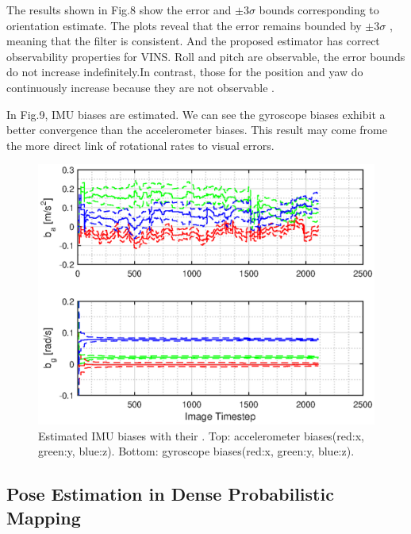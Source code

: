 \documentclass[a4paper, 10pt, conference]{ieeeconf}      %
\begin{document}
The results shown in Fig.8 show the error and $ \pm 3 \sigma $ bounds corresponding to orientation estimate. The plots reveal that the error remains bounded by $ \pm 3 \sigma $ , meaning that the filter is consistent. And the proposed estimator has correct observability properties for VINS.  Roll and pitch are observable, the error bounds do not increase indefinitely.In contrast, those for the position and yaw do continuously increase because they are not observable \cite{kelly2011visual}.



 
 

In Fig.9, IMU biases are estimated. We can see the gyroscope biases exhibit a better convergence than the accelerometer biases. This result may come frome the more direct link of rotational rates to visual errors.
 


\begin{figure}[thpb]
	\centering
	
	\includegraphics[scale=0.6]{bias.eps}
	
	\caption{Estimated IMU biases with their . Top: accelerometer biases(red:x, green:y, blue:z). Bottom: gyroscope biases(red:x, green:y, blue:z).}
	\label{figurelabel}
\end{figure}

\subsection{Pose Estimation in Dense Probabilistic Mapping}
\end{document}
